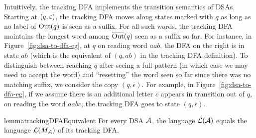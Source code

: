 Intuitively, the tracking DFA implements the transition semantics of
DSAs. Starting at $(q, \varepsilon)$, the tracking DFA moves along states
marked with $q$ as long as no label of $\operatorname{Out}(q)$ is seen as a
suffix. For all such words, the tracking DFA maintains the longest
word among $\overline{\operatorname{Out}}(q)$ seen as a suffix so far. For instance, in
Figure~\ref{fig:dsa-to-dfa-eg}, at $q$ on reading word $aab$, the DFA
on the right is in state $ab$ (which is the equivalent of $(q, ab)$ in
the tracking DFA definition). To distinguish between reaching $q$ after seeing a full pattern (in which case we may need to accept the word) and ``resetting'' the word seen so far since there was no matching suffix, we consider the copy $(q, \overline{\epsilon})$. For example, in Figure~\ref{fig:dsa-to-dfa-eg}, if we assume there is an additional letter $c$ appears in transition out of $q$, on reading the word $aabc$, the tracking DFA goes to state $(q, \overline{\epsilon})$.


  



\begin{restatable}{lemma}{trackingDFAEquivalent}
  \label{lem:tracking-dfa-language-equivalent}
  For every DSA $\mathcal{A}$, the language $\mathcal{L}(\mathcal{A})$ equals the language
  $\mathcal{L}(M_{\mathcal{A}})$ of its tracking DFA.
\end{restatable}

